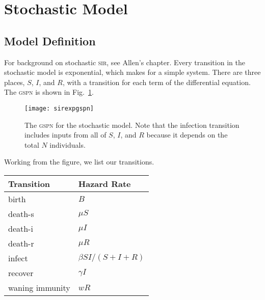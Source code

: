 \documentclass{article}
\newcommand{\sir}{\textsc{sir}\xspace}
\newcommand{\gspn}{\textsc{gspn}\xspace}
\begin{document}
\section{Stochastic Model}
\subsection{Model Definition}
For background on stochastic \sir, see Allen's chapter\cite{Allen:2008ma}.
Every transition in the stochastic model is exponential, which makes for
a simple system. There are three places, $S$, $I$, and $R$, with a transition
for each term of the differential equation. The \gspn is shown in Fig.~\ref{fig:sirgspn}.
\begin{figure}
\centerline{\texttt{[image: sirexpgspn]}}
\caption{The \gspn for the stochastic model. Note that the infection
transition includes inputs from all of $S$, $I$, and $R$ because it depends
on the total $N$ individuals.\label{fig:sirgspn}}
\end{figure}
Working from the figure, we list our transitions. \\
\begin{tabular}{ll}
  \hline
  Transition & Hazard Rate \\
  \hline
  birth & $B$ \\
  death-s & $\mu S$ \\
  death-i & $\mu I$ \\
  death-r & $\mu R$ \\
  infect & $\beta SI/(S+I+R)$ \\
  recover & $\gamma I$ \\
  waning immunity & $w R$ \\
  \hline
\end{tabular}
\end{document}
